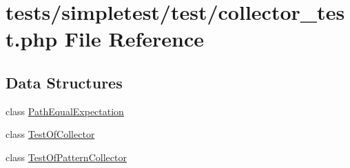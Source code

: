 \hypertarget{collector__test_8php}{\section{tests/simpletest/test/collector\-\_\-test.php File Reference}
\label{collector__test_8php}
}
\subsection*{Data Structures}
\begin{DoxyCompactItemize}
\item 
class \hyperlink{class_path_equal_expectation}{Path\-Equal\-Expectation}
\item 
class \hyperlink{class_test_of_collector}{Test\-Of\-Collector}
\item 
class \hyperlink{class_test_of_pattern_collector}{Test\-Of\-Pattern\-Collector}
\end{DoxyCompactItemize}
